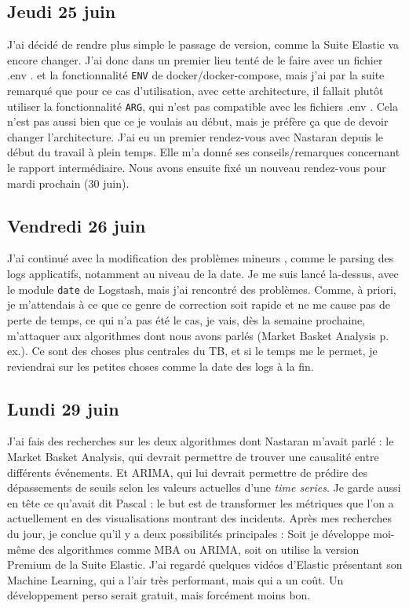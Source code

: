 \documentclass[paper=a4, fontsize=11pt]{scrartcl}
\begin{document}
\subsection{Jeudi 25 juin}
    J'ai décidé de rendre plus simple le passage de version, comme la Suite Elastic va encore changer. J'ai donc dans un premier lieu tenté de le faire avec un fichier \og .env \fg. et la fonctionnalité \verb,ENV, de docker/docker-compose, mais j'ai par la suite remarqué que pour ce cas d'utilisation, avec cette architecture, il fallait plutôt utiliser la fonctionnalité \verb,ARG,, qui n'est pas compatible avec les fichiers \og .env \fg. Cela n'est pas aussi bien que ce je voulais au début, mais je préfère ça que de devoir changer l'architecture.
    J'ai eu un premier rendez-vous avec Nastaran depuis le début du travail à plein temps. Elle m'a donné ses conseils/remarques concernant le rapport intermédiaire. Nous avons ensuite fixé un nouveau rendez-vous pour mardi prochain (30 juin).
\subsection{Vendredi 26 juin}
    J'ai continué avec la modification des problèmes \og mineurs \fg, comme le parsing des logs applicatifs, notamment au niveau de la date. Je me suis lancé la-dessus, avec le module \verb,date, de Logstash, mais j'ai rencontré des problèmes. Comme, à priori, je m'attendais à ce que ce genre de correction soit rapide et ne me cause pas de perte de temps, ce qui n'a pas été le cas, je vais, dès la semaine prochaine, m'attaquer aux algorithmes dont nous avons parlés (Market Basket Analysis p. ex.). Ce sont des choses plus centrales du TB, et si le temps me le permet, je reviendrai sur les petites choses comme la date des logs à la fin.
\subsection{Lundi 29 juin}
    J'ai fais des recherches sur les deux algorithmes dont Nastaran m'avait parlé : le Market Basket Analysis, qui devrait permettre de trouver une causalité entre différents événements. Et ARIMA, qui lui devrait permettre de prédire des dépassements de seuils selon les valeurs actuelles d'une \textit{time series}. Je garde aussi en tête ce qu'avait dit Pascal : le but est de transformer les métriques que l'on a actuellement en des visualisations montrant des incidents. Après mes recherches du jour, je conclue qu'il y a deux possibilités principales : Soit je développe moi-même des algorithmes comme MBA ou ARIMA, soit on utilise la version Premium de la Suite Elastic. J'ai regardé quelques vidéos d'Elastic présentant son Machine Learning, qui a l'air très performant, mais qui a un coût. Un développement perso serait gratuit, mais forcément moins bon.
\end{document}
